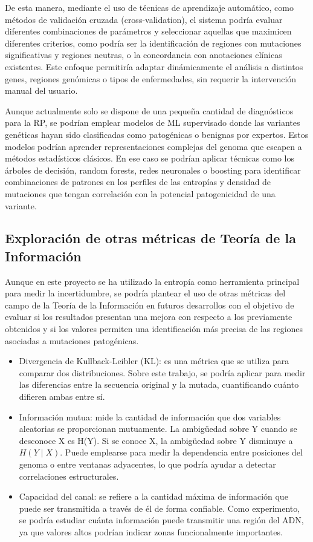 \documentclass[11pt,spanish,listoffigures,listoftables]{tfgetsinf}
\begin{document}
De esta manera, mediante el uso de técnicas de aprendizaje automático, como métodos de validación cruzada (cross-validation), el sistema podría evaluar diferentes combinaciones de parámetros y seleccionar aquellas que maximicen diferentes criterios, como podría ser la identificación de regiones con mutaciones significativas y regiones neutras, o la concordancia con anotaciones clínicas existentes. Este enfoque permitiría adaptar dinámicamente el análisis a distintos genes, regiones genómicas o tipos de enfermedades, sin requerir la intervención manual del usuario.

Aunque actualmente solo se dispone de una pequeña cantidad de diagnósticos para la \ac{RP}, se podrían emplear modelos de ML supervisado donde las variantes genéticas hayan sido clasificadas como patogénicas o benignas por expertos. Estos modelos podrían aprender representaciones complejas del genoma que escapen a métodos estadísticos clásicos. En ese caso se podrían aplicar técnicas como los árboles de decisión, random forests, redes neuronales o boosting para identificar combinaciones de patrones en los perfiles de las entropías y densidad de mutaciones que tengan correlación con la potencial patogenicidad de una variante.


\subsection{Exploración de otras métricas de Teoría de la Información}

Aunque en este proyecto se ha utilizado la entropía como herramienta principal para medir la incertidumbre, se podría plantear el uso de otras métricas del campo de la Teoría de la Información en futuros desarrollos con el objetivo de evaluar si los resultados presentan una mejora con respecto a los previamente obtenidos y si los valores permiten una identificación más precisa de las regiones asociadas a mutaciones patogénicas.

\begin{itemize}
   \item Divergencia de Kullback-Leibler (KL): es una métrica que se utiliza para comparar dos distribuciones. Sobre este trabajo, se podría aplicar para medir las diferencias entre la secuencia original y la mutada, cuantificando cuánto difieren ambas entre sí\cite{BUH}.
   \item Información mutua: mide la cantidad de información que dos variables aleatorias se proporcionan mutuamente. La ambigüedad sobre Y cuando se desconoce X es H(Y). Si se conoce X, la ambigüedad sobre Y disminuye a \( H(Y \mid X) \). Puede emplearse para medir la dependencia entre posiciones del genoma o entre ventanas adyacentes, lo que podría ayudar a detectar correlaciones estructurales\cite{HUS}.
   \item Capacidad del canal: se refiere a la cantidad máxima de información que puede ser transmitida a través de él de forma confiable. Como experimento, se podría estudiar cuánta información puede transmitir una región del \ac{ADN}, ya que valores altos podrían indicar zonas funcionalmente importantes\cite{BLA}.\\
\end{itemize}
\end{document}
